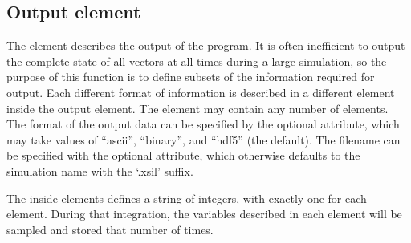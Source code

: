 \documentclass[letterpaper,10pt,english]{sphinxmanual}
\begin{document}
\subsection{Output element}
\label{\detokenize{reference_elements:output-element}}\label{\detokenize{reference_elements:outputelement}}\label{\detokenize{reference_elements:index-88}}
\ignorespaces 
\sphinxAtStartPar
The  element describes the output of the program.  It is often inefficient to output the complete state of all vectors at all times during a large simulation, so the purpose of this function is to define subsets of the information required for output.  Each different format of information is described in a different  element inside the output element.  The  element may contain any number of  elements.  The format of the output data can be specified by the optional  attribute, which may take values of “ascii”, “binary”, and “hdf5” (the default).  The filename can be specified with the optional  attribute, which otherwise defaults to the simulation name with the ‘.xsil’ suffix.

\sphinxAtStartPar
The  inside  elements defines a string of integers, with exactly one for each  element.  During that integration, the variables described in each  element will be sampled and stored that number of times.

\ignorespaces 
{}\ignorespaces 
\end{document}
